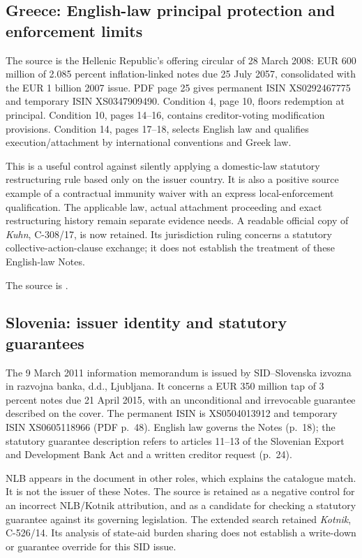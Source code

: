 \subsection{Greece: English-law principal protection and enforcement limits}

The source is the Hellenic Republic's offering circular of 28 March 2008:
EUR 600 million of 2.085 percent inflation-linked notes due 25 July 2057,
consolidated with the EUR 1 billion 2007 issue. PDF page 25 gives permanent
ISIN XS0292467775 and temporary ISIN XS0347909490. Condition 4, page 10,
floors redemption at principal. Condition 10, pages 14--16, contains
creditor-voting modification provisions. Condition 14, pages 17--18, selects
English law and qualifies execution/attachment by international conventions
and Greek law.

This is a useful control against silently applying a domestic-law statutory
restructuring rule based only on the issuer country. It is also a positive
source example of a contractual immunity waiver with an express
local-enforcement qualification. The applicable law, actual attachment
proceeding and exact restructuring history remain separate evidence needs.
A readable official copy of \emph{Kuhn}, C-308/17, is now retained. Its
jurisdiction ruling concerns a statutory collective-action-clause exchange;
it does not establish the treatment of these English-law Notes.

The source is
.

\subsection{Slovenia: issuer identity and statutory guarantees}

The 9 March 2011 information memorandum is issued by SID--Slovenska izvozna
in razvojna banka, d.d., Ljubljana. It concerns a EUR 350 million tap of
3 percent notes due 21 April 2015, with an unconditional and irrevocable
guarantee described on the cover. The permanent ISIN is XS0504013912 and
temporary ISIN XS0605118966 (PDF p.~48). English law governs the Notes
(p.~18); the statutory guarantee description refers to articles 11--13 of
the Slovenian Export and Development Bank Act and a written creditor
request (p.~24).

NLB appears in the document in other roles, which explains the catalogue
match. It is not the issuer of these Notes. The source is retained as a
negative control for an incorrect NLB/Kotnik attribution, and as a candidate
for checking a statutory guarantee against its governing legislation.
The extended search retained \emph{Kotnik}, C-526/14. Its analysis of
state-aid burden sharing does not establish a write-down or guarantee
override for this SID issue.

